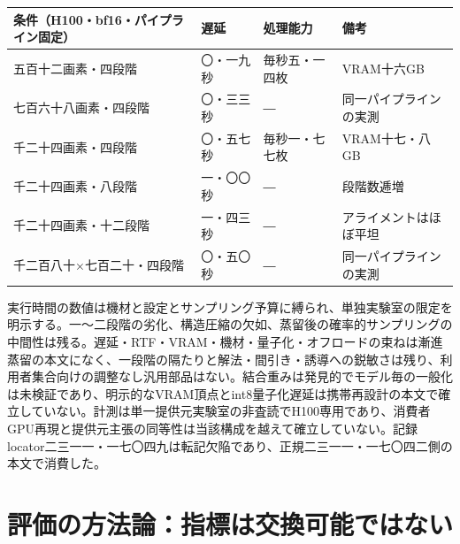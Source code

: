 \documentclass[lualatex,a4paper,10pt]{jlreq}
\begin{document}
\begin{center}
\small
\begin{tabularx}{\textwidth}{@{}p{}p{}p{}X@{}}
\toprule
条件（H100・bf16・パイプライン固定） & 遅延 & 処理能力 & 備考 \\
\midrule
五百十二画素・四段階 & 〇・一九秒 & 毎秒五・一四枚 & VRAM十六GB \\
七百六十八画素・四段階 & 〇・三三秒 & ― & 同一パイプラインの実測 \\
千二十四画素・四段階 & 〇・五七秒 & 毎秒一・七七枚 & VRAM十七・八GB \\
千二十四画素・八段階 & 一・〇〇秒 & ― & 段階数逓増 \\
千二十四画素・十二段階 & 一・四三秒 & ― & アライメントはほぼ平坦 \\
千二百八十×七百二十・四段階 & 〇・五〇秒 & ― & 同一パイプラインの実測 \\
\bottomrule
\end{tabularx}
\end{center}
\autocite{btd137}

\begin{claimboundary}[本節の読解上の境界]
実行時間の数値は機材と設定とサンプリング予算に縛られ、単独実験室の限定を明示する。一〜二段階の劣化、構造圧縮の欠如、蒸留後の確率的サンプリングの中間性は残る。遅延・RTF・VRAM・機材・量子化・オフロードの束ねは漸進蒸留の本文になく、一段階の隔たりと解法・間引き・誘導への鋭敏さは残り、利用者集合向けの調整なし汎用部品はない。結合重みは発見的でモデル毎の一般化は未検証であり、明示的なVRAM頂点とint8量子化遅延は携帯再設計の本文で確立していない。計測は単一提供元実験室の非査読でH100専用であり、消費者GPU再現と提供元主張の同等性は当該構成を越えて確立していない。記録locator二三一一・一七〇四九は転記欠陥であり、正規二三一一・一七〇四二側の本文で消費した。
\end{claimboundary}

\section{評価の方法論：指標は交換可能ではない}
\label{sec:evaluation}
\end{document}
